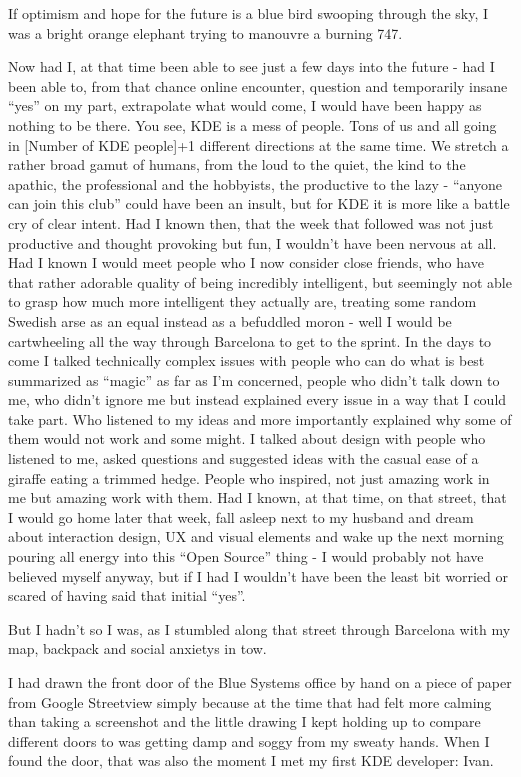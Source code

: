 If optimism and hope for the future is a blue bird swooping through the sky, I was a bright orange elephant trying to manouvre a burning 747.

Now had I, at that time been able to see just a few days into the future - had I been able to, from that chance online encounter, question and temporarily insane “yes” on my part, extrapolate what would come, I would have been happy as nothing to be there. 
You see, KDE is a mess of people. Tons of us and all going in [Number of KDE people]+1 different directions at the same time. We stretch a rather broad gamut of humans, from the loud to the quiet, the kind to the apathic, the professional and the hobbyists, the productive to the lazy - “anyone can join this club” could have been an insult, but for KDE it is more like a battle cry of clear intent.
Had I known then, that the week that followed was not just productive and thought provoking but fun, I wouldn’t have been nervous at all. Had I known I would meet people who I now consider close friends, who have that rather adorable quality of being incredibly intelligent, but seemingly not able to grasp how much more intelligent they actually are, treating some random Swedish arse as an equal instead as a befuddled moron - well I would be cartwheeling all the way through Barcelona to get to the sprint. 
In the days to come I talked technically complex issues with people who can do what is best summarized as “magic” as far as I’m concerned, people who didn’t talk down to me, who didn’t ignore me but instead explained every issue in a way that I could take part. Who listened to my ideas and more importantly explained why some of them would not work and some might.
I talked about design with people who listened to me, asked questions and suggested ideas with the casual ease of a giraffe eating a trimmed hedge. People who inspired, not just amazing work in me but amazing work with them. 
Had I known, at that time, on that street, that I would go home later that week, fall asleep next to my husband and dream about interaction design, UX and visual elements and wake up the next morning pouring all energy into this “Open Source” thing - I would probably not have believed myself anyway, but if I had I wouldn’t have been the least bit worried or scared of having said that initial “yes”. 

But I hadn’t so I was, as I stumbled along that street through Barcelona with my map, backpack and social anxietys in tow.

I had drawn the front door of the Blue Systems office by hand on a piece of paper from Google Streetview simply because at the time that had felt more calming than taking a screenshot and the little drawing I kept holding up to compare different doors to was getting damp and soggy from my sweaty hands. When I found the door, that was also the moment I met my first KDE developer: Ivan.

